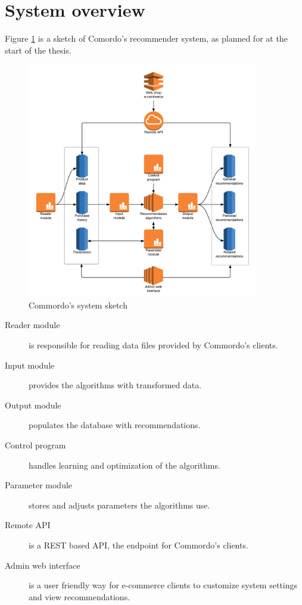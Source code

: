 \section{System overview}\label{sec:sysoverview}

Figure \ref{fig:sysoverview} is a sketch of Comordo's recommender system, as planned for at the start of the thesis.

\begin{figure}[h!]
  \centering
    \includegraphics[width=0.9\textwidth]{fig/system_overview.png}
  \caption{Commordo's system sketch}
  \label{fig:sysoverview}
\end{figure}

\FloatBarrier

\begin{description}
    \item[Reader module] is responsible for reading data files provided by Commordo's clients.
    \item[Input module] provides the algorithms with transformed data.
    \item[Output module] populates the database with recommendations.
    \item[Control program] handles learning and optimization of the algorithms.
    \item[Parameter module] stores and adjusts parameters the algorithms use.
    \item[Remote API] is a REST based API, the endpoint for Commordo's clients.
    \item[Admin web interface] is a user friendly way for e-commerce clients to customize system settings and view recommendations.
\end{description}

